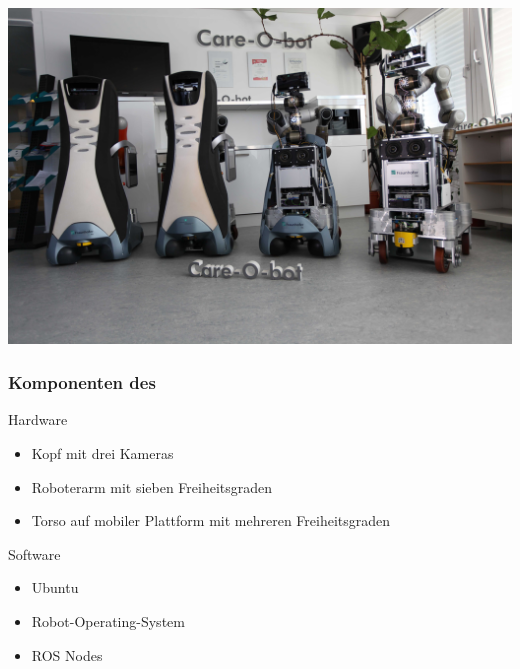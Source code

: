 \bgroup
{}
\begin{frame}[plain]



  \hspace*{-1.05cm} \includegraphics[width=\paperwidth]{images/cobs}
\end{frame}
\egroup





\placelogofalse
\begin{frame}
  \frametitle{Komponenten des \cob}
\begin{block}
  {Hardware}
\begin{itemize}
    \pause
    \item Kopf mit drei Kameras \pause
    \item Roboterarm mit sieben Freiheitsgraden \pause
    \item Torso auf mobiler Plattform mit mehreren Freiheitsgraden \pause
  \end{itemize}
\end{block}

\pause

\begin{block}{Software}
  \pause
    \begin{itemize}
      \item Ubuntu \pause
      \item Robot-Operating-System \pause
      \item ROS Nodes
    \end{itemize}
  \end{block}
\end{frame}

\placelogotrue
